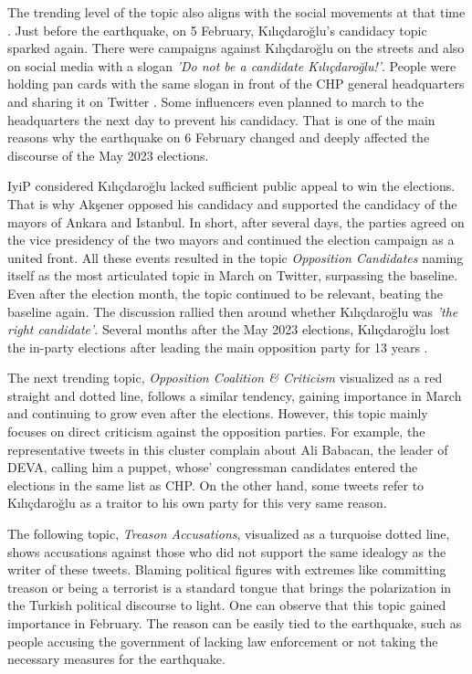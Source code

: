 The trending level of the topic also aligns with the social movements at that time 
\parencite{gultekin_kilicdaroglu_aday_2023}. 
Just before the earthquake, on 5 February, Kılıçdaroğlu's candidacy topic sparked again. 
There were campaigns against Kılıçdaroğlu on the streets and also on social media with a slogan 
\textit{'Do not be a candidate Kılıçdaroğlu!'}. People were holding pan cards with the same slogan 
in front of the \ac{CHP} general headquarters and sharing it on Twitter \parencite{ulas_kilicdaroglu_aday_pankart_2023}. 
Some influencers even planned to march to the headquarters the next day to prevent his candidacy. 
That is one of the main reasons why the earthquake on 6 February changed and deeply affected 
the discourse of the May 2023 elections.

\ac{IyiP} considered Kılıçdaroğlu lacked sufficient public appeal to win the elections. 
That is why Akşener opposed his candidacy and supported the candidacy of the mayors of Ankara and Istanbul. 
In short, after several days, the parties agreed on the vice presidency of the two mayors and 
continued the election campaign as a united front. All these events resulted in the topic 
\textit{Opposition Candidates} naming itself as the most articulated topic in March on Twitter, 
surpassing the baseline. Even after the election month, the topic continued to be relevant, 
beating the baseline again. The discussion rallied then around whether Kılıçdaroğlu was 
\textit{'the right candidate'}. Several months after the May 2023 elections, Kılıçdaroğlu lost the in-party 
elections after leading the main opposition party for 13 years \parencite{gundogan_chp_özgür_özel_2023}.


The next trending topic, \textit{Opposition Coalition \& Criticism} visualized as a red straight 
and dotted line, follows a similar tendency, gaining importance in March and continuing to 
grow even after the elections. However, this topic mainly focuses on direct criticism against 
the opposition parties. For example, the representative tweets in this cluster complain about 
Ali Babacan, the leader of \ac{DEVA}, calling him a puppet, whose' congressman candidates 
entered the elections in the same list as \ac{CHP}. On the other hand, some tweets refer to 
Kılıçdaroğlu as a traitor to his own party for this very same reason.

The following topic, \textit{Treason Accusations}, visualized as a turquoise dotted line, shows 
accusations against those who did not support the same idealogy as the writer of these tweets. 
Blaming political figures with extremes like committing treason or being a terrorist is a standard 
tongue that brings the polarization in the Turkish political discourse to light. 
One can observe that this topic gained importance in February. 
The reason can be easily tied to the earthquake, such as people accusing the government of lacking 
law enforcement or not taking the necessary measures for the earthquake.

